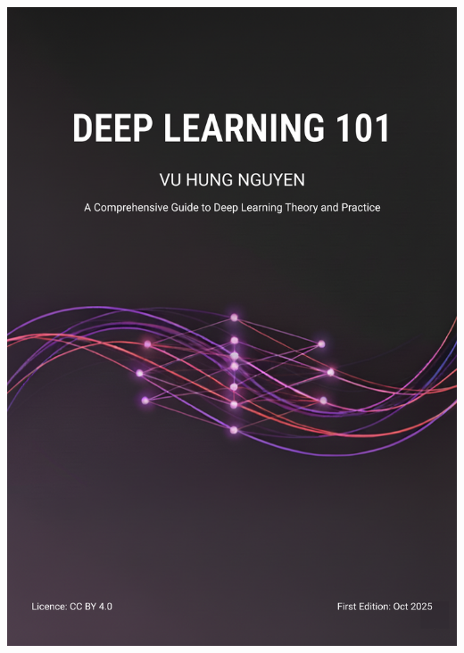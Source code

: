 \documentclass[10pt,\papersize,twoside,openright]{book}
\begin{document}
{{{{        \includegraphics[width=\paperwidth,height=\paperheight]{images/DeepLearning101-cover-A5.png}%
      }{%
        }}}}
\end{document}
